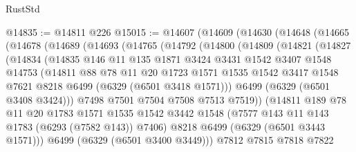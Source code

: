 \begin{lexlean}{RustStd}
\begin{coremodule}
{{@14835 := @14811 @226
@15015 := @14607
    (@14609
      (@14630
        (@14648
          (@14665
            (@14678
              (@14689
                (@14693
                  (@14765
                    (@14792
                      (@14800
                        (@14809
                          (@14821
                            (@14827
                              (@14834
                                (@14835
                                  @146
                                  @11
                                  @135
                                  @1871
                                  @3424
                                  @3431
                                  @1542
                                  @3407
                                  @1548
                                  @14753
                                  (@14811
                                    @88
                                    @78
                                    @11
                                    @20
                                    @1723
                                    @1571
                                    @1535
                                    @1542
                                    @3417
                                    @1548
                                    @7621
                                    @8218
                                    @6499
                                    (@6329 (@6501 @3418 @1571)))
                                  @6499
                                  (@6329 (@6501 @3408 @3424)))
                                @7498
                                @7501
                                @7504
                                @7508
                                @7513
                                @7519))
                            (@14811
                              @189
                              @78
                              @11
                              @20
                              @1783
                              @1571
                              @1535
                              @1542
                              @3442
                              @1548
                              (@7577 @143 @11 @143 @1783 (@6293 (@7582 @143)) @7406)
                              @8218
                              @6499
                              (@6329 (@6501 @3443 @1571)))
                            @6499
                            (@6329 (@6501 @3400 @3449)))
                          @7812
                          @7815
                          @7818
                          @7822
}}
\end{coremodule}
\end{lexlean}
